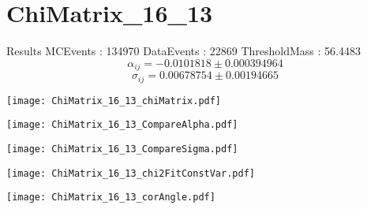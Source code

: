 \documentclass[a4paper,12pt]{article}
\begin{document}
\section{ChiMatrix\_16\_13}
\begin{minipage}{0.49\linewidth} Results \newline
MCEvents : 134970\newline
DataEvents : 22869 \newline
ThresholdMass : 56.4483\\
$$\alpha_{ij} = -0.0101818\pm 0.000394964$$
$$\sigma_{ij} = 0.00678754\pm 0.00194665$$
\end{minipage}\hfill
\begin{minipage}{0.49\linewidth} 
\texttt{[image: ChiMatrix\_16\_13\_chiMatrix.pdf]}\\
\end{minipage}
\hfill
\begin{minipage}{0.49\linewidth} 
\texttt{[image: ChiMatrix\_16\_13\_CompareAlpha.pdf]}\\
\end{minipage}
\hfill
\begin{minipage}{0.49\linewidth} 
\texttt{[image: ChiMatrix\_16\_13\_CompareSigma.pdf]}\\
\end{minipage}
\begin{minipage}{0.49\linewidth} 
\texttt{[image: ChiMatrix\_16\_13\_chi2FitConstVar.pdf]}\\
\end{minipage}
\hfill
\begin{minipage}{0.49\linewidth} 
\texttt{[image: ChiMatrix\_16\_13\_corAngle.pdf]}\\
\end{minipage}
\end{document}
